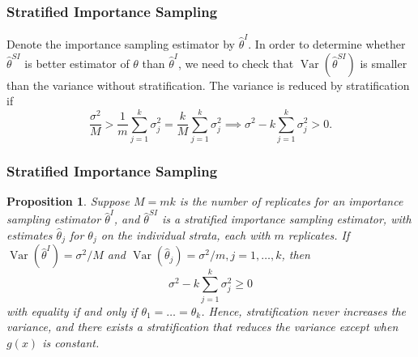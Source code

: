 \documentclass{beamer}
\newtheorem{proposition}{Proposition}
\begin{document}
\begin{frame}[fragile]
\frametitle{Stratified Importance Sampling}

Denote the importance sampling estimator by $\widehat{\theta}^{I}$. In order to determine whether $\widehat{\theta}^{SI}$ is better estimator of $\theta$ than $\widehat{\theta}^{I}$, we need to check that $\operatorname{Var}\left(\widehat{\theta}^{SI}\right)$ is smaller than the variance without stratification. The variance is reduced by stratification if 
\[
\frac{\sigma^2}{M}>\frac{1}{m}\sum_{j=1}^k\sigma_j^2=\frac{k}{M}\sum_{j=1}^k\sigma_j^2 \implies \sigma^2-k\sum_{j=1}^k\sigma_j^2>0.
\]
\end{frame}

\begin{frame}[fragile]
\frametitle{Stratified Importance Sampling}

\begin{proposition}
Suppose $M = mk$ is the number of replicates for an importance sampling estimator $\widehat{\theta}^{I}$, and $\widehat{\theta}^{SI}$ is a stratified importance sampling estimator, with estimates $\widehat{\theta}_{j}$ for $\theta_j$ on the individual strata, each with $m$ replicates. If $\operatorname{Var}\left(\widehat{\theta}^{I}\right)=\sigma^2/M$ and $\operatorname{Var}\left(\widehat{\theta}_{j}\right)=\sigma^2/m, j=1,\ldots,k$, then
\[
\sigma^2-k\sum_{j=1}^k \sigma_j^2\geq 0
\]
with equality if and only if $\theta_1=\dots=\theta_k$. Hence, stratification never increases the variance, and there exists a stratification that reduces the variance except when $g(x)$ is constant.
\end{proposition}
\end{frame}
\end{document}
